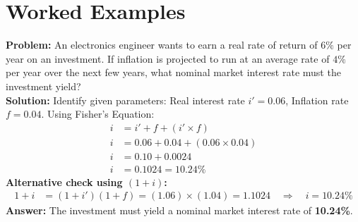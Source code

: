 \documentclass[12pt,a4paper]{article}
\begin{document}
\section{Worked Examples}

\begin{tcolorbox}[examplebox, title={Example 1: Fisher's Equation}]
\textbf{Problem:} An electronics engineer wants to earn a real rate of return of $6\%$ per year on an investment. If inflation is projected to run at an average rate of $4\%$ per year over the next few years, what nominal market interest rate must the investment yield?\\[4pt]
\textbf{Solution:}
Identify given parameters: Real interest rate $i' = 0.06$, Inflation rate $f = 0.04$.
Using Fisher's Equation:
\begin{align*}
  i &= i' + f + (i' \times f) \\
  i &= 0.06 + 0.04 + (0.06 \times 0.04) \\
  i &= 0.10 + 0.0024 \\
  i &= 0.1024 = 10.24\%
\end{align*}
\textbf{Alternative check using $(1+i)$:}
\begin{align*}
  1 + i &= (1 + i')(1 + f) = (1.06) \times (1.04) = 1.1024 \quad \Rightarrow \quad i = 10.24\%
\end{align*}
\textbf{Answer:} The investment must yield a nominal market interest rate of \textbf{10.24\%}.
\end{tcolorbox}
\end{document}
